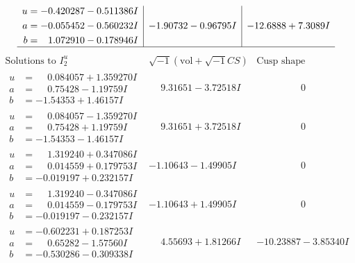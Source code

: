 \documentclass[1p]{elsarticle_modified}
\theoremstyle{definition}
\newcommand{\I}{\sqrt{-1}}
\begin{document}
$$\begin{array}{c|c|c}
\begin{aligned}
u &= -0.420287 - 0.511386 I \\
a &= -0.055452 - 0.560232 I \\
b &= \phantom{-}1.072910 - 0.178946 I\end{aligned}
 & -1.90732 - 0.96795 I & -12.6888 + 7.3089 I\\
 \hline 
 \end{array}$$\newpage$$\begin{array}{c|c|c}  
\text{Solutions to }I^u_{2}& \I (\text{vol} + \sqrt{-1}CS) & \text{Cusp shape}\\
 \hline 
\begin{aligned}
u &= \phantom{-}0.084057 + 1.359270 I \\
a &= \phantom{-}0.75428 - 1.19759 I \\
b &= -1.54353 + 1.46157 I\end{aligned}
 & \phantom{-}9.31651 - 3.72518 I & \phantom{-0.000000 } 0 \\ \hline\begin{aligned}
u &= \phantom{-}0.084057 - 1.359270 I \\
a &= \phantom{-}0.75428 + 1.19759 I \\
b &= -1.54353 - 1.46157 I\end{aligned}
 & \phantom{-}9.31651 + 3.72518 I & \phantom{-0.000000 } 0 \\ \hline\begin{aligned}
u &= \phantom{-}1.319240 + 0.347086 I \\
a &= \phantom{-}0.014559 + 0.179753 I \\
b &= -0.019197 + 0.232157 I\end{aligned}
 & -1.10643 - 1.49905 I & \phantom{-0.000000 } 0 \\ \hline\begin{aligned}
u &= \phantom{-}1.319240 - 0.347086 I \\
a &= \phantom{-}0.014559 - 0.179753 I \\
b &= -0.019197 - 0.232157 I\end{aligned}
 & -1.10643 + 1.49905 I & \phantom{-0.000000 } 0 \\ \hline\begin{aligned}
u &= -0.602231 + 0.187253 I \\
a &= \phantom{-}0.65282 - 1.57560 I \\
b &= -0.530286 - 0.309338 I\end{aligned}
 & \phantom{-}4.55693 + 1.81266 I & -10.23887 - 3.85340 I \\ \hline\begin{aligned}

\end{aligned}
\end{array}$$
\end{document}
